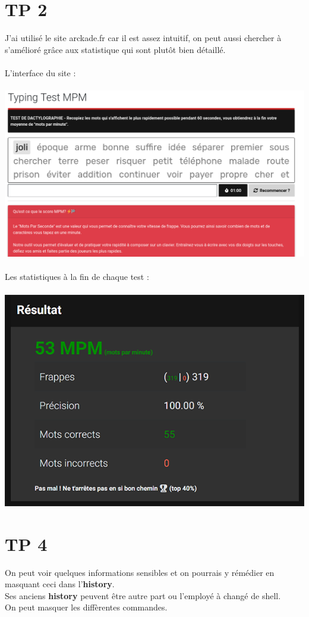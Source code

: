 \documentclass{report}
\begin{document}
\section{TP 2}
J'ai utilisé le site arckade.fr car il est assez intuitif, on peut aussi
chercher à s'amélioré grâce aux statistique qui sont plutôt bien détaillé.
\\
\\
\newpage
L'interface du site :
\\
\\  
\includegraphics{arckade}
\\
\\
Les statistiques à la fin de chaque test :
\\
\\ 
\includegraphics{stats} 
\\
\newpage
\section{TP 4}
On peut voir quelques informations sensibles et on pourrais y rémédier en 
masquant ceci dans l'\textbf{history}.
\\
Ses anciens \textbf{history} peuvent être autre part ou l'employé à 
changé de shell. 
\\
On peut masquer les diffèrentes commandes.
\\
\end{document}
